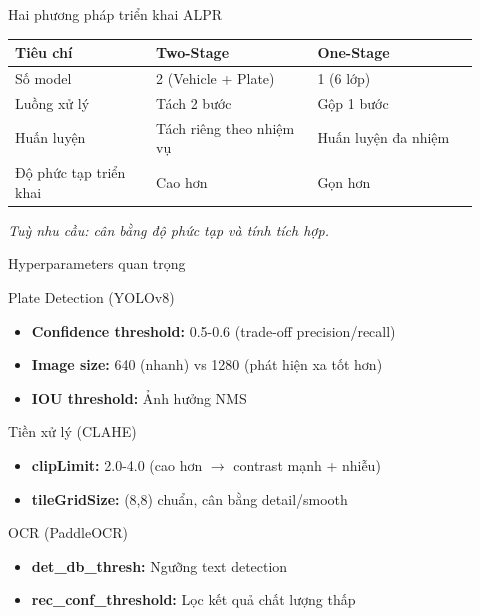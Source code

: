 \begin{frame}{Hai phương pháp triển khai ALPR}
    \begin{table}
        \centering
        \begin{tabular}{p{0.28\linewidth} p{0.32\linewidth} p{0.32\linewidth}}
            \toprule
            \textbf{Tiêu chí} & \textbf{Two-Stage} & \textbf{One-Stage} \\
            \midrule
            Số model & 2 (Vehicle + Plate) & 1 (6 lớp) \\
            Luồng xử lý & Tách 2 bước & Gộp 1 bước \\
            Huấn luyện & Tách riêng theo nhiệm vụ & Huấn luyện đa nhiệm \\
            Độ phức tạp triển khai & Cao hơn & Gọn hơn \\
            \bottomrule
        \end{tabular}
    \end{table}

    \textit{Tuỳ nhu cầu: cân bằng độ phức tạp và tính tích hợp.}
\end{frame}
\begin{frame}{Hyperparameters quan trọng}
    \begin{block}{Plate Detection (YOLOv8)}
    \begin{itemize}
        \item \textbf{Confidence threshold:} 0.5-0.6 (trade-off precision/recall)
        \item \textbf{Image size:} 640 (nhanh) vs 1280 (phát hiện xa tốt hơn)
        \item \textbf{IOU threshold:} Ảnh hưởng NMS
    \end{itemize}
    \end{block}
    
    \begin{block}{Tiền xử lý (CLAHE)}
    \begin{itemize}
        \item \textbf{clipLimit:} 2.0-4.0 (cao hơn $\rightarrow$ contrast mạnh + nhiễu)
        \item \textbf{tileGridSize:} (8,8) chuẩn, cân bằng detail/smooth
    \end{itemize}
    \end{block}
    
    \begin{block}{OCR (PaddleOCR)}
    \begin{itemize}
        \item \textbf{det\_db\_thresh:} Ngưỡng text detection
        \item \textbf{rec\_conf\_threshold:} Lọc kết quả chất lượng thấp
    \end{itemize}
    \end{block}
\end{frame}

